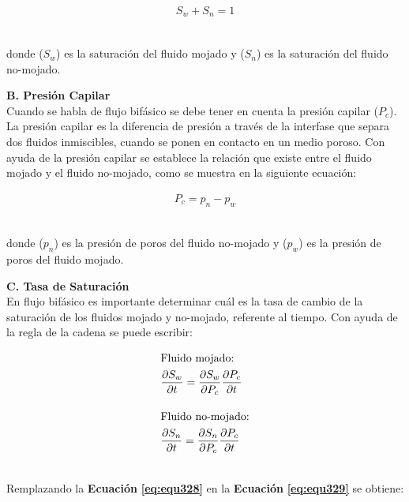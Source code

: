 \begin{ceqn} 
\begin{gather} \label{eq:equ27} 
S_w + S_n = 1
\end{gather}  
\end{ceqn}
\\
donde ($S_w$) es la saturación del fluido mojado y ($S_n$) es la saturación del fluido no-mojado.\bigskip\bigskip


\textbf{B. Presión Capilar}
\\
Cuando se habla de flujo bifásico se debe tener en cuenta la presión capilar ($P_c$). La presión capilar es la diferencia de presión a través de la interfase que separa dos fluidos inmiscibles, cuando se ponen en contacto en un medio poroso. Con ayuda de la presión capilar se establece la relación que existe entre el fluido mojado y el fluido no-mojado, como se muestra en la siguiente ecuación:\bigskip

\begin{ceqn} 
\begin{gather} \label{eq:equ328} 
P_c = p_n - p_w
\end{gather}  
\end{ceqn}
\\
donde ($p_n$) es la presión de poros del fluido no-mojado y ($p_w$) es la presión de poros del fluido mojado.\bigskip\bigskip


\textbf{C. Tasa de Saturación}
\\
En flujo bifásico es importante determinar cuál es la tasa de cambio de la saturación de los fluidos mojado y no-mojado, referente al tiempo. Con ayuda de la regla de la cadena se puede escribir:

\begin{ceqn} 
\begin{subequations} \label{eq:equ329} 
\begin{align}
\shortintertext{Fluido mojado:} &\frac{\partial S_w}{\partial t} = \frac{\partial S_w}{\partial P_c}\frac{\partial P_c}{\partial t} \label{eq:equ329a} \\[10pt]
\shortintertext{Fluido no-mojado:} 			&\frac{\partial S_n}{\partial t} = \frac{\partial S_n}{\partial P_c}\frac{\partial P_c}{\partial t} \label{eq:equ329b}
\end{align}
\end{subequations} 
\end{ceqn}
\\
Remplazando la \textbf{Ecuación} \textbf{\ref{eq:equ328}} en la \textbf{Ecuación} \textbf{\ref{eq:equ329}} se obtiene:

